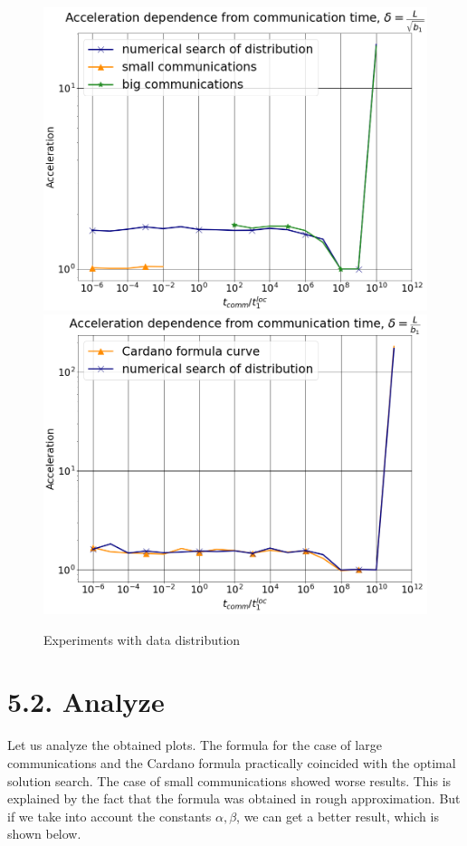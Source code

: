 \documentclass{article}
\theoremstyle{definition}
\theoremstyle{plain}
\begin{document}
\begin{figure}[!ht]
    {\includegraphics[scale = 0.25]{график11.png}}
    {\includegraphics[scale = 0.25]{график22.png}}
    \caption{Experiments with data distribution}
    \label{ris:image}
\end{figure}



\section*{5.2. Analyze}
Let us analyze the obtained plots. The formula for the case of large communications and the Cardano formula practically coincided with the optimal solution search. The case of small communications showed worse results. This is explained by the fact that the formula was obtained in rough approximation. But if we take into account the constants $\alpha, \beta$, we can get a better result, which is shown below.
\end{document}
